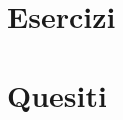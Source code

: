 \documentclass[12pt,openany]{amsbook}
\theoremstyle{plain}
\numberwithin{equation}{section} %
\theoremstyle{definition}
\theoremstyle{remark}
\begin{document}
    

    \tableofcontents

    \part{Esercizi}
    
    
    
    
    


    \part{Quesiti}
    
    
\end{document}
